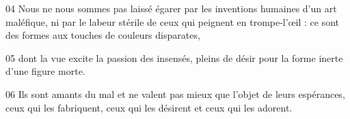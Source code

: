 
04 Nous ne nous sommes pas laissé égarer par les inventions humaines d’un art maléfique, ni par le labeur stérile de ceux qui peignent en trompe-l’œil : ce sont des formes aux touches de couleurs disparates,

05 dont la vue excite la passion des insensés, pleins de désir pour la forme inerte d’une figure morte.

06 Ils sont amants du mal et ne valent pas mieux que l’objet de leurs espérances, ceux qui les fabriquent, ceux qui les désirent et ceux qui les adorent.
